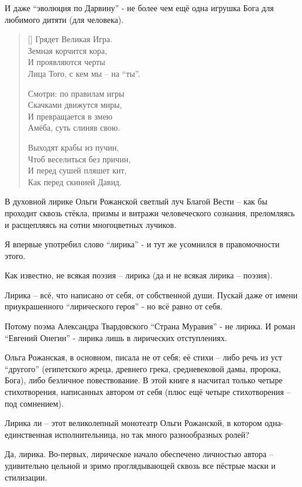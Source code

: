 \documentclass[12pt,a5paper,twoside]{article}
\begin{document}
И даже ``эволюция по Дарвину'' - не более чем ещё одна игрушка Бога для любимого дитяти (для человека).

\settowidth{\versewidth}{Грядет Великая Игра.}
\begin{verse}[\versewidth]
Грядет Великая Игра.\\
Земная корчится кора,\\
И проявляются черты\\
Лица Того, с кем мы -- на ``ты''.

Смотри: по правилам игры\\
Скачками движутся миры,\\
И превращается в змею\\
Амёба, суть слиняв свою.

Выходят крабы из пучин,\\
Чтоб веселиться без причин,\\
И перед сушей пляшет кит,\\
Как перед скинией Давид.
\end{verse}
 
В духовной лирике Ольги Рожанской светлый луч Благой Вести -- как бы проходит сквозь стёкла, 
призмы и витражи человеческого сознания, преломляясь и расщепляясь на сотни многоцветных лучиков.

Я впервые употребил слово ``лирика'' - и тут же усомнился в правомочности этого.

Как известно, не всякая поэзия -- лирика (да и не всякая лирика -- поэзия).

Лирика -- всё, что написано от себя, от собственной души. Пускай даже от имени приукрашенного ``лирического героя'' - но всё равно от себя.

Потому поэма Александра Твардовского ``Страна Муравия'' - не лирика. 
И роман ``Евгений Онегин'' - лирика лишь в лирических отступлениях.

Ольга Рожанская, в основном, писала не от себя; её стихи -- либо речь из 
уст ``другого'' (египетского жреца, древнего грека, средневековой дамы, пророка, Бога), 
либо безличное повествование. В этой книге я насчитал только четыре стихотворения, 
написанных автором от себя (плюс ещё четыре стихотворения -- под сомнением).

Лирика ли -- этот великолепный монотеатр Ольги Рожанской, в котором одна-единственная исполнительница, но так много разнообразных ролей?

Да, лирика.
Во-первых, лирическое начало обеспечено личностью 
автора -- удивительно цельной и зримо проглядывающей
сквозь все пёстрые маски и стилизации.
\end{document}
